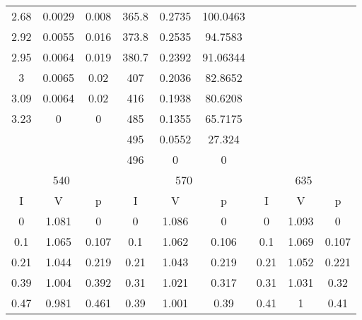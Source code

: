 \begin{table*}[]
\begin{tabular}{|c|c|c|c|c|c|c|c|c|}
2.68        & 0.0029       & 0.008      & 365.8      & 0.2735     & 100.0463     & \multicolumn{3}{c|}{}                   \\ \cline{1-6}
2.92        & 0.0055       & 0.016      & 373.8      & 0.2535     & 94.7583      & \multicolumn{3}{c|}{}                   \\ \cline{1-6}
2.95        & 0.0064       & 0.019      & 380.7      & 0.2392     & 91.06344     & \multicolumn{3}{c|}{}                   \\ \cline{1-6}
3           & 0.0065       & 0.02       & 407        & 0.2036     & 82.8652      & \multicolumn{3}{c|}{}                   \\ \cline{1-6}
3.09        & 0.0064       & 0.02       & 416        & 0.1938     & 80.6208      & \multicolumn{3}{c|}{}                   \\ \cline{1-6}
3.23        & 0            & 0          & 485        & 0.1355     & 65.7175      & \multicolumn{3}{c|}{}                   \\ \cline{1-6}
\multicolumn{3}{|c|}{\multirow{2}{*}{}} & 495        & 0.0552     & 27.324       & \multicolumn{3}{c|}{}                   \\ \cline{4-6}
\multicolumn{3}{|c|}{}                  & 496        & 0          & 0            & \multicolumn{3}{c|}{}                   \\ \hline
\multicolumn{3}{|c|}{540}               & \multicolumn{3}{c|}{570}               & \multicolumn{3}{c|}{635}                \\ \hline
I           & V            & p          & I          & V          & p            & I          & V           & p            \\ \hline
0           & 1.081        & 0          & 0          & 1.086      & 0            & 0          & 1.093       & 0            \\ \hline
0.1         & 1.065        & 0.107      & 0.1        & 1.062      & 0.106        & 0.1        & 1.069       & 0.107        \\ \hline
0.21        & 1.044        & 0.219      & 0.21       & 1.043      & 0.219        & 0.21       & 1.052       & 0.221        \\ \hline
0.39        & 1.004        & 0.392      & 0.31       & 1.021      & 0.317        & 0.31       & 1.031       & 0.32         \\ \hline
0.47        & 0.981        & 0.461      & 0.39       & 1.001      & 0.39         & 0.41       & 1           & 0.41         \\ \hline

\end{tabular}
\end{table*}
